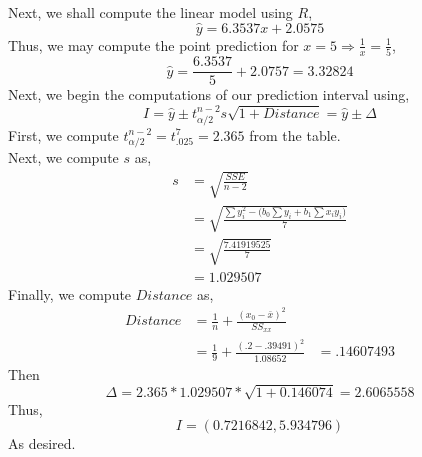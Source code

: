 \documentclass[letterpaper,10pt]{article}
\begin{document}
\begin{description}
\begin{center}
\end{center}
Next, we shall compute the linear model using $R$,
\[\hat{y}=6.3537x+2.0575\]
Thus, we may compute the point prediction for $x=5\Rightarrow\frac{1}{x}=\frac{1}{5}$,
\[\hat{y}=\frac{6.3537}{5}+2.0757=3.32824\]
Next, we begin the computations of our prediction interval using,
\[I=\hat{y}\pm t_{\alpha /2}^{n-2}s\sqrt{1+Distance}=\hat{y}\pm\Delta\]
First, we compute $t_{\alpha/2}^{n-2}=t_{.025}^7=2.365$ from the table.\\
Next, we compute $s$ as,
\begin{align*}
s &= \sqrt{\frac{SSE}{n-2}}\\
&=\sqrt{\frac{\sum y_i^2-\big(b_0\sum y_i+b_1\sum x_iy_i\big)}{7}}\\
&=\sqrt{\frac{7.41919525}{7}}\\
&=1.029507
\end{align*}
Finally, we compute $Distance$ as,
\begin{align*}
Distance &= \frac{1}{n}+\frac{(x_0-\bar{x})^2}{SS_{xx}}\\
&=\frac{1}{9}+\frac{(.2-.39491)^2}{1.08652}
&=.14607493
\end{align*}
Then
\[\Delta=2.365*1.029507*\sqrt{1+0.146074}=2.6065558\]
Thus,
\[I=(0.7216842,5.934796)\]
As desired.
\end{description}
\end{document}
